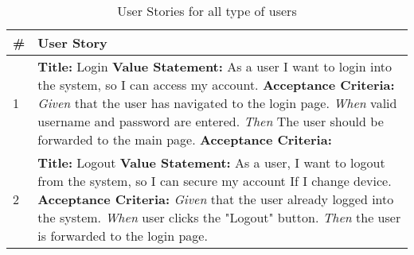 \documentclass[a4paper]{article}
\begin{document}
        \begin{longtable}[c]{|p{0.5cm}||p{}|}
          \caption{User Stories for all type of users}
            \label{userStoriesForAllTypeOfUsers} \\
            \hline
             \# & User Story    \\
             \hline
             \endhead
              1 & 
                 \textbf{Title:} Login   \newline
                 \textbf{Value Statement:} As a user I want to login into the system, so I can access my account. \newline
                  \textbf{Acceptance Criteria:} \newline
                 \emph{Given} that the user has navigated to the login page.  \newline 
                 \emph{When} valid username and password are entered. \newline
                 \emph{Then} The user should be forwarded to the main page. \newline
                  \textbf{Acceptance Criteria:}
            \\
             \hline
               2 & 
                 \textbf{Title:} Logout   \newline
                 \textbf{Value Statement:}  As a user, I want to logout from the system, so I can secure my account If I change device.\newline
                 \textbf{Acceptance Criteria:} \newline
                 \emph{Given} that the user already logged into the system.\newline 
                 \emph{When} user clicks the "Logout" button. \newline
                 \emph{Then} the user is forwarded to the login page.
                 
                 \\
                 \hline
          
        \end{longtable}
        
\end{document}
